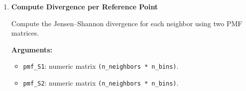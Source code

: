 \begin{enumerate}
        Build histogram bin counts and normalized probability mass functions (PMFs) for each neighbor, using a shared residual range and a fixed number of bins.  
        A logical or integer mask selects which neighbors contribute to each reference point’s histogram.

        \textbf{Arguments:}
        \begin{itemize}
            \item \lstinline!neighborhood_residuals!: numeric matrix \lstinline!(n_residuals * n_neighbors)!.
            \item \lstinline!shared_residual_range!: numeric scalar \(R\).
            \item \lstinline!n_bins!: integer number of histogram bins.
            \item \lstinline!neighbor_mask!: logical or integer matrix \lstinline!(n_neighbors * n_points)!, where non‑zero indicates inclusion.
        \end{itemize}

        \textbf{Returns:}
        \begin{itemize}
            \item \lstinline!list!: \{
                \lstinline!counts!: integer matrix \lstinline!(n_neighbors * n_bins)!,\\
                \lstinline!pmf!: numeric matrix \lstinline!(n_neighbors * n_bins)!,\\
                \lstinline!included_n_residuals!: integer vector \lstinline!(n_neighbors)!
            \}
        \end{itemize}

\begin{lstlisting}[language=R, caption={Filtered Residual Histogram Construction}]
out <- tox_build_residual_histograms_filtered(
  neighborhood_residuals,
  shared_residual_range,
  n_bins,
  neighbor_mask
)

counts   <- out$counts
pmf      <- out$pmf
included <- out$included_n_residuals
\end{lstlisting}

    \item \textbf{Compute Divergence per Reference Point}

        Compute the Jensen–Shannon divergence for each neighbor using two PMF matrices.

        \textbf{Arguments:}
        \begin{itemize}
            \item \lstinline!pmf_S1!: numeric matrix \lstinline!(n_neighbors * n_bins)!.
            \item \lstinline!pmf_S2!: numeric matrix \lstinline!(n_neighbors * n_bins)!.
        \end{itemize}


\end{enumerate}
